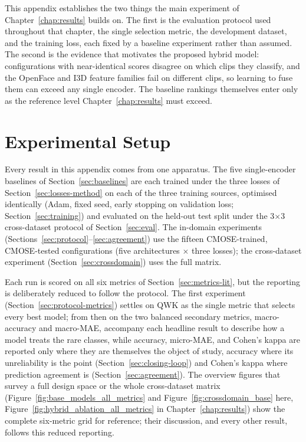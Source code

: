 \documentclass[../main.tex]{subfiles}
\begin{document}
This appendix establishes the two things the main experiment of Chapter~\ref{chap:results} builds on. The first is the evaluation protocol used throughout that chapter, the single selection metric, the development dataset, and the training loss, each fixed by a baseline experiment rather than assumed. The second is the evidence that motivates the proposed hybrid model: configurations with near-identical scores disagree on which clips they classify, and the OpenFace and I3D feature families fail on different clips, so learning to fuse them can exceed any single encoder. The baseline rankings themselves enter only as the reference level Chapter~\ref{chap:results} must exceed.

\FloatBarrier
\section{Experimental Setup}
\label{sec:setup-baseline}

Every result in this appendix comes from one apparatus. The five single-encoder baselines of Section~\ref{sec:baselines} are each trained under the three losses of Section~\ref{sec:losses-method} on each of the three training sources, optimised identically (Adam, fixed seed, early stopping on validation loss; Section~\ref{sec:training}) and evaluated on the held-out test split under the 3$\times$3 cross-dataset protocol of Section~\ref{sec:eval}. The in-domain experiments (Sections~\ref{sec:protocol}--\ref{sec:agreement}) use the fifteen CMOSE-trained, CMOSE-tested configurations (five architectures $\times$ three losses); the cross-dataset experiment (Section~\ref{sec:crossdomain}) uses the full matrix.

Each run is scored on all six metrics of Section~\ref{sec:metrics-lit}, but the reporting is deliberately reduced to follow the protocol. The first experiment (Section~\ref{sec:protocol-metrics}) settles on QWK as the single metric that selects every best model; from then on the two balanced secondary metrics, macro-accuracy and macro-MAE, accompany each headline result to describe how a model treats the rare classes, while accuracy, micro-MAE, and Cohen's kappa are reported only where they are themselves the object of study, accuracy where its unreliability is the point (Section~\ref{sec:closing-loop}) and Cohen's kappa where prediction agreement is (Section~\ref{sec:agreement}). The overview figures that survey a full design space or the whole cross-dataset matrix (Figure~\ref{fig:base_models_all_metrics} and Figure~\ref{fig:crossdomain_base} here, Figure~\ref{fig:hybrid_ablation_all_metrics} in Chapter~\ref{chap:results}) show the complete six-metric grid for reference; their discussion, and every other result, follows this reduced reporting.
\end{document}

